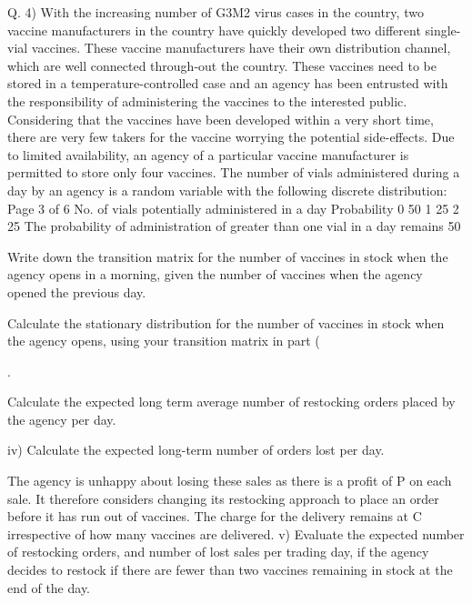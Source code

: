Q. 4)
With the increasing number of G3M2 virus cases in the country, two vaccine manufacturers in the country have quickly developed two different single-vial vaccines. These vaccine manufacturers have their own distribution channel, which are well connected through-out the country. These vaccines need to be stored in a temperature-controlled case and an agency has been entrusted with the responsibility of administering the vaccines to the interested public. Considering that the vaccines have been developed within a very short time, there are very few takers for the vaccine worrying the potential side-effects. Due to limited availability, an agency of a particular vaccine manufacturer is permitted to store only four vaccines.
The number of vials administered during a day by an agency is a random variable with the following discrete distribution:
Page 3 of 6
No. of vials potentially administered in a day
Probability
0
50%
1
25%
2
25%
The probability of administration of greater than one vial in a day remains 50%
\item  Write down the transition matrix for the number of vaccines in stock when the agency opens in a morning, given the number of vaccines when the agency opened the previous day.

\item   Calculate the stationary distribution for the number of vaccines in stock when the agency opens, using your transition matrix in part (\item .

\item   Calculate the expected long term average number of restocking orders placed by the agency per day.

iv) Calculate the expected long-term number of orders lost per day.

The agency is unhappy about losing these sales as there is a profit of P on each sale. It therefore considers changing its restocking approach to place an order before it has run out of vaccines. The charge for the delivery remains at C irrespective of how many vaccines are delivered.
v) Evaluate the expected number of restocking orders, and number of lost sales per trading day, if the agency decides to restock if there are fewer than two vaccines remaining in stock at the end of the day.

